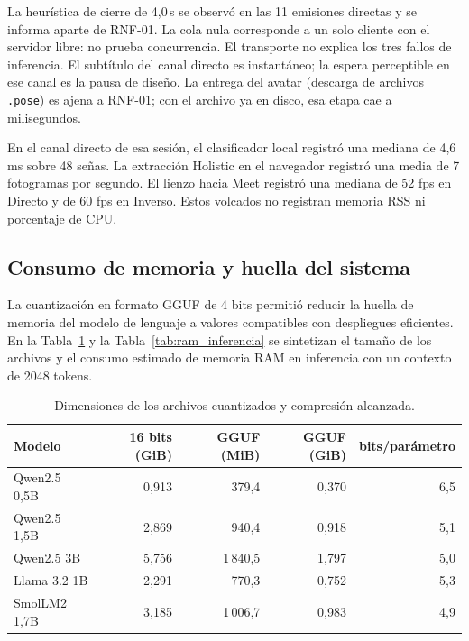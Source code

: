 La heurística de cierre de 4{,}0\,s se observó en las 11 emisiones directas y se informa aparte de RNF-01. La cola nula corresponde a un solo cliente con el servidor libre: no prueba concurrencia. El transporte no explica los tres fallos de inferencia. El subtítulo del canal directo es instantáneo; la espera perceptible en ese canal es la pausa de diseño. La entrega del avatar (descarga de archivos \texttt{.pose}) es ajena a RNF-01; con el archivo ya en disco, esa etapa cae a milisegundos.

En el canal directo de esa sesión, el clasificador local registró una mediana de 4{,}6\,ms sobre 48 señas. La extracción Holistic en el navegador registró una media de 7 fotogramas por segundo. El lienzo hacia Meet registró una mediana de 52 fps en Directo y de 60 fps en Inverso. Estos volcados no registran memoria RSS ni porcentaje de CPU.

\subsection{Consumo de memoria y huella del sistema}
La cuantización en formato GGUF de 4 bits permitió reducir la huella de memoria del modelo de lenguaje a valores compatibles con despliegues eficientes. En la Tabla~\ref{tab:pesos_cuant} y la Tabla~\ref{tab:ram_inferencia} se sintetizan el tamaño de los archivos y el consumo estimado de memoria RAM en inferencia con un contexto de 2048 tokens.

\begin{table}[H]
\centering
\footnotesize
\caption{Dimensiones de los archivos cuantizados y compresión alcanzada.}
\label{tab:pesos_cuant}
\begin{tabular}{lrrrr}
\toprule
\textbf{Modelo} & \textbf{16 bits (GiB)} & \textbf{GGUF (MiB)} & \textbf{GGUF (GiB)} & \textbf{bits/parámetro} \\
\midrule
Qwen2.5 0,5B & 0,913 & 379,4 & 0,370 & 6,5 \\
Qwen2.5 1,5B & 2,869 & 940,4 & 0,918 & 5,1 \\
Qwen2.5 3B   & 5,756 & 1\,840,5 & 1,797 & 5,0 \\
Llama 3.2 1B & 2,291 & 770,3 & 0,752 & 5,3 \\
SmolLM2 1,7B & 3,185 & 1\,006,7 & 0,983 & 4,9 \\
\bottomrule
\end{tabular}
\end{table}

